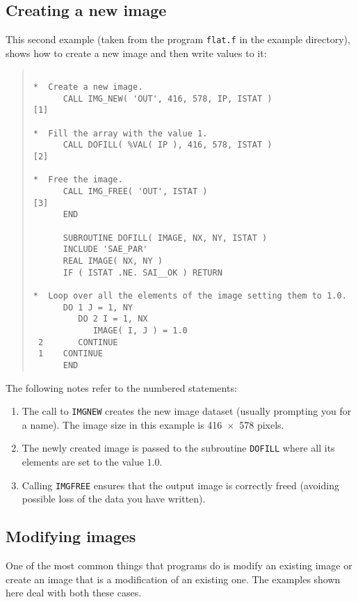\documentclass[twoside,11pt]{article}
\newcommand{\htmladdnormallink}[2]{#1}
\newcommand{\htmlref}[2]{#1}
\renewcommand{\_}{\texttt{\symbol{95}}}
\newcommand{\myverb}[1]{{\texttt{#1}}}
\newcommand{\mynote}{The following notes refer to the numbered statements:}
\newenvironment{code}{\begin{small} \begin{quote}}
                     {\end{quote} \end{small}}
\newenvironment{enumnotes}
{
   \renewcommand{\labelenumi}{\myverb{[\theenumi]}}
   \begin{enumerate}
}{
   \end{enumerate}
   \renewcommand{\labelenumi}{\theenumi}
}
\renewenvironment{enumnotes}
  {
    \begin{enumerate}
  }{
    \end{enumerate}
  }
\begin{document}
\subsection{Creating a new image}
This second example (taken from the program
\htmladdnormallink{\myverb{flat.f}}{../../bin/examples/img/flat.f}
in the example directory), shows how to
create a new image and then write values to it:
\begin{code}
\begin{verbatim}

*  Create a new image.
      CALL IMG_NEW( 'OUT', 416, 578, IP, ISTAT )              [1]

*  Fill the array with the value 1.
      CALL DOFILL( %VAL( IP ), 416, 578, ISTAT )              [2]

*  Free the image.
      CALL IMG_FREE( 'OUT', ISTAT )                           [3]
      END

      SUBROUTINE DOFILL( IMAGE, NX, NY, ISTAT )
      INCLUDE 'SAE_PAR'
      REAL IMAGE( NX, NY )
      IF ( ISTAT .NE. SAI__OK ) RETURN

*  Loop over all the elements of the image setting them to 1.0.
      DO 1 J = 1, NY
         DO 2 I = 1, NX
            IMAGE( I, J ) = 1.0
 2       CONTINUE
 1    CONTINUE
      END

\end{verbatim}
\end{code}
\mynote
\begin{enumnotes}
\item The call to \htmlref{\myverb{IMG\_NEW}}{IMG_NEWnx} creates the new image dataset
(usually prompting you for a name). The image size in this example is
416~$\times$~578 pixels.

\item The newly created image is passed to the subroutine
\myverb{DOFILL} where all its elements are set to the value $1.0$.

\item Calling \htmlref{\myverb{IMG\_FREE}}{IMG_FREE} ensures that the output image is
correctly freed (avoiding possible loss of the data you have written).
\end{enumnotes}

\subsection{Modifying images}
One of the most common things that programs do is modify an existing
image or create an image that is a modification of an existing one. The
examples shown here deal with both these cases.
\end{document}
